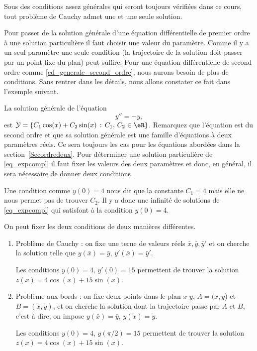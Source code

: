 \begin{remark}
	Sous des conditions assez générales qui seront toujours vérifiées dans ce cours, tout problème de Cauchy admet une et une seule solution.
\end{remark}
Pour passer de la solution générale d'une équation différentielle de premier ordre \`a une solution particulière il faut choisir une valeur du paramètre. Comme il y a un seul paramètre une seule condition (la trajectoire de la solution doit passer par un point fixe du plan) peut suffire. Pour une équation différentielle de second ordre comme \eqref{ed_generale_second_ordre}, nous aurons besoin de plus de conditions. Sans rentrer dans les détails, nous allons constater ce fait dans l'exemple suivant.

\begin{example}
	La solution générale de l'équation
	\begin{equation}\label{eq_expcompl}
		y'' = -y,
	\end{equation}
	est \(\mathcal{Y}= \{C_1\cos(x) + C_2\sin(x) \, :\, C_1,\, C_2\in\eR\}\). Remarquez que l'équation est du second ordre et que sa solution générale est une famille d'équations \`a deux paramètres réels. Ce sera toujours les cas pour les équations abordées dans la section~\ref{Secordredeux}.
	Pour déterminer une solution particulière de \eqref{eq_expcompl} il faut fixer les valeurs des deux paramètres et donc, en général, il sera nécessaire de donner deux conditions.
\end{example}

\begin{remark}
	Une condition comme \(y(0)=4\) nous dit que la constante \( C_1 = 4\) mais elle ne nous permet pas de trouver \( C_2\). Il y a donc une infinité de solutions de \eqref{eq_expcompl} qui satisfont \`a la condition \(y(0)=4\).
\end{remark}

On peut fixer les deux conditions de deux manières différentes.
\begin{enumerate}
	\item{Problème  de Cauchy :} on fixe une terne de valeurs réels \(\bar x, \bar y, \bar y'\) et on cherche la solution telle que \(y(\bar x) = \bar y\), \(y'(\bar x) = \bar y'\).

	\begin{example}
		Les conditions \(y(0)=4\), \(y'(0)=15\) permettent de trouver la solution \(z(x) = 4\cos(x) + 15\sin(x)\).
	\end{example}
	\item{Problème aux bords :} on fixe deux points dans le plan \( x\)-\( y\), \(A=(\bar x, \bar y\)) et \(B=(\tilde x, \tilde y)\), et on cherche la solution dont la trajectoire passe par \( A\) et \( B\), c'est \`a dire, on impose \(y(\bar x) = \bar y\), \(y(\tilde x) = \tilde y\).

	\begin{example}
		Les conditions \(y(0)=4\), \(y(\pi/2)=15\) permettent de trouver la solution \(z(x) = 4\cos(x) + 15\sin(x)\).
	\end{example}
\end{enumerate}

